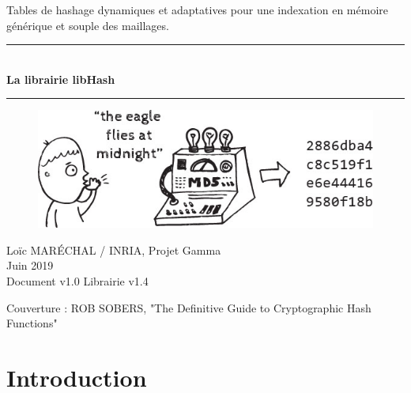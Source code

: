 \documentclass[a4paper,12pt]{article}
\newcommand{\HRule}{\rule{\linewidth}{1mm}}
\begin{document}
%
%

\begin{titlepage}

\begin{center}
\huge Tables de hashage dynamiques et adaptatives pour une indexation en mémoire générique et souple des maillages.
\HRule \\
\medskip
{\Huge \bfseries La librairie libHash} \\
\HRule
\end{center}


\begin{figure}[htbp]
\begin{center}
\includegraphics[width=14cm]{eagle.jpg}
\end{center}
\end{figure}


\begin{flushright}
\Large Lo\"ic MAR\'ECHAL / INRIA, Projet Gamma\\
\Large Juin 2019 \\
\normalsize Document v1.0
\normalsize Librairie v1.4
\end{flushright}

\end{titlepage}

\clearpage

\setcounter{tocdepth}{2}
\tableofcontents
\vfill

\footnotesize{Couverture : ROB SOBERS, "The Definitive Guide to Cryptographic Hash Functions"}
\normalsize

\clearpage


%
%

\section{Introduction}
\end{document}
